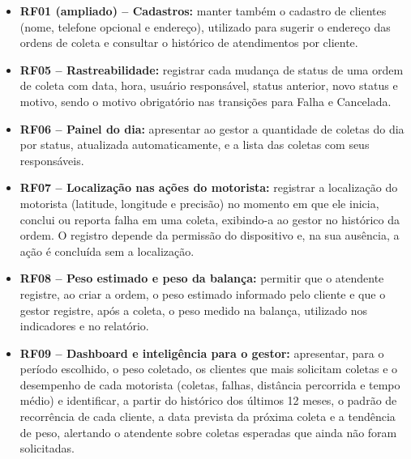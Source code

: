 

\begin{itemize}
  \item \textbf{RF01 (ampliado) -- Cadastros:} manter também o cadastro de clientes (nome, telefone opcional e endereço), utilizado para sugerir o endereço das ordens de coleta e consultar o histórico de atendimentos por cliente.
  \item \textbf{RF05 -- Rastreabilidade:} registrar cada mudança de status de uma ordem de coleta com data, hora, usuário responsável, status anterior, novo status e motivo, sendo o motivo obrigatório nas transições para Falha e Cancelada.
  \item \textbf{RF06 -- Painel do dia:} apresentar ao gestor a quantidade de coletas do dia por status, atualizada automaticamente, e a lista das coletas com seus responsáveis.
  \item \textbf{RF07 -- Localização nas ações do motorista:} registrar a localização do motorista (latitude, longitude e precisão) no momento em que ele inicia, conclui ou reporta falha em uma coleta, exibindo-a ao gestor no histórico da ordem. O registro depende da permissão do dispositivo e, na sua ausência, a ação é concluída sem a localização.
  \item \textbf{RF08 -- Peso estimado e peso da balança:} permitir que o atendente registre, ao criar a ordem, o peso estimado informado pelo cliente e que o gestor registre, após a coleta, o peso medido na balança, utilizado nos indicadores e no relatório.
  \item \textbf{RF09 -- Dashboard e inteligência para o gestor:} apresentar, para o período escolhido, o peso coletado, os clientes que mais solicitam coletas e o desempenho de cada motorista (coletas, falhas, distância percorrida e tempo médio) e identificar, a partir do histórico dos últimos 12 meses, o padrão de recorrência de cada cliente, a data prevista da próxima coleta e a tendência de peso, alertando o atendente sobre coletas esperadas que ainda não foram solicitadas.

\end{itemize}
